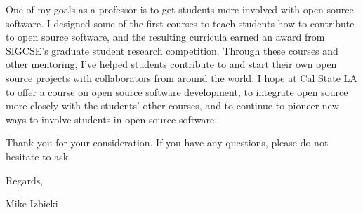 \documentclass[12pt]{article}
\newcommand{\school}[2]{\textcolor{red}{\textbf{{#1}:} {#2}}}
\begin{document}
\noindent
One of my goals as a professor is to get students more involved with open source software.
I designed some of the first courses to teach students how to contribute to open source software,
and the resulting curricula earned an award from SIGCSE's graduate student research competition.
Through these courses and other mentoring, 
I've helped students contribute to and start their own open source projects with collaborators from around the world.
I hope at Cal State LA to offer a course on open source software development,
to integrate open source more closely with the students' other courses,
and to continue to pioneer new ways to involve students in open source software.

\noindent
Thank you for your consideration.
If you have any questions,
please do not hesitate to ask.

\noindent
Regards,

\vspace{-0.10in}
\noindent
Mike Izbicki

%
%
%
%
%
\end{document}
